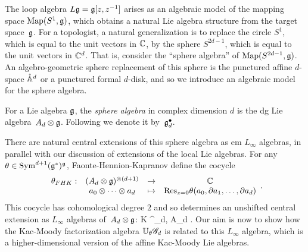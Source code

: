 The loop algebra $L\mathfrak g = \mathfrak g[z,z^{-1}]$ arises as an algebraic model of the mapping space ${\rm Map}(S^1,\mathfrak g)$,
which obtains a natural Lie algebra structure from the target space~$\mathfrak g$.
For a topologist, a natural generalization is to replace the circle $S^1$, which is equal to the unit vectors in $\mathbb C$, by the sphere $S^{2d-1}$, which is equal to the unit vectors in $\mathbb C^d$.
That is, consider the ``sphere algebra'' of ${\rm Map}(S^{2d-1},\mathfrak g)$.
An algebro-geometric sphere replacement of this sphere is the punctured affine $d$-space $\mathring{\mathbb A}^{d}$ or a punctured formal $d$-disk,
and so we introduce an algebraic model for the sphere algebra.

\begin{dfn}
For a Lie algebra $\mathfrak g$, the {\em sphere algebra} in complex dimension $d$ is the dg Lie algebra~$A_d \otimes \mathfrak g$.
Following \cite{FHK} we denote it by~$\mathfrak g^\bullet_d$.
\end{dfn}

There are natural central extensions of this sphere algebra as {em $L_\infty$ algebras},
in parallel with our discussion of extensions of the local Lie algebras.
For any $\theta \in {\rm Sym}^{d+1}(\mathfrak g^*)^\mathfrak g$, Faonte-Hennion-Kapranov define the cocycle
\[
\label{fhk cocycle}
\begin{array}{cccc}
\theta_{FHK} : & (A_d \otimes \mathfrak g)^{\otimes (d+1)} & \to & \mathbb C\\ 
& a_0 \otimes \cdots \otimes a_d & \mapsto & {\rm Res}_{z=0} \theta(a_0,\partial a_1,\ldots,\partial a_d)
\end{array}.
\]
This cocycle has cohomological degree $2$ and so determines an unshifted central extension as $L_\infty$ algebras of~$A_d \otimes \mathfrak g$:
\beqn\label{gdt}
\CC \cdot K \to \widetilde{\fg}^\bullet_{d, \theta} \to A_d \tensor \fg .
\eeqn
Our aim is now to show how the Kac-Moody factorization algebra $\mathbb U_\theta \mathscr G_d$ is related to this $L_\infty$ algebra,
which is a higher-dimensional version of the affine Kac-Moody Lie algebras. 

%

